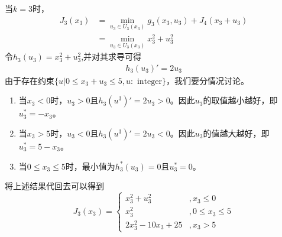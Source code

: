\documentclass{article}
\begin{document}
\begin{enumerate}[(a)]
        
            当$k=3$时，
            \begin{equation}
                \begin{split}
                    J_3(x_3)&=\min_{u_3\in U_3(x_3)}g_3(x_3,u_3)+J_4(x_3+u_3)\\
                    &=\min_{u_3\in U_3(x_3)}x_3^2+u_3^2
                \end{split}
            \end{equation}
            令$h_3(u_3)=x_3^2+u_3^2$,并对其求导可得
            \begin{equation}
                \begin{split}
                    h_3(u_3)'=2u_3
                \end{split}
            \end{equation}
            由于存在约束$\{u|0\leq x_3+u_3\leq 5, u:\text{ integer}\}$，我们要分情况讨论。
            \begin{enumerate}
                \item 当$x_3<0$时，$u_3>0$且$h_3(u^3)'=2u_3>0$。因此$u_3$的取值越小越好，即$u_3^*=-x_3$。
                \item 当$x_3>5$时，$u_3<0$且$h_3(u^3)'=2u_3<0$。因此$u_3$的值越大越好，即$u_3^*=5-x_3$。
                \item 当$0\leq x_3\leq 5$时，最小值为$h_3^*(u_3)=0$且$u_3^*=0$。
            \end{enumerate}
            将上述结果代回去可以得到
            \begin{equation}
                J_3(x_3)=
                \begin{cases}
                    x_3^2+u_3^2 & ,x_3\leq 0\\
                    x_3^2 & ,0\leq x_3\leq 5\\
                    2x_3^2-10x_3+25 & ,x_3>5
                \end{cases}
            \end{equation}


\end{enumerate}
\end{document}
